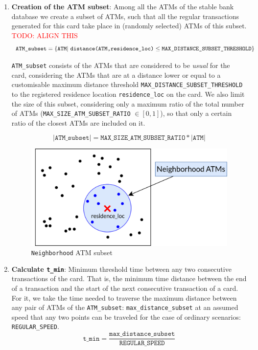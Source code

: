 \documentclass{article}
\begin{document}
\begin{enumerate}
    \item \textbf{Creation of the ATM subset}: Among all the ATMs of the stable bank database we create a subset of ATMs, such that all the regular transactions generated for this card take place in (randomly selected) ATMs of this subset. 
    \textcolor{red}{TODO: ALIGN THIS}
    $$\texttt{ATM\_subset} = \{\texttt{ATM}\ \\
    |\ \texttt{distance(ATM,residence\_loc)} \leq \texttt{MAX\_DISTANCE\_SUBSET\_THRESHOLD}\}$$

    \texttt{ATM\_subset} consists of the ATMs that are considered to be \textit{usual} for the card, considering the ATMs that are at a distance lower or equal to a customisable maximum distance threshold \texttt{MAX\_DISTANCE\_SUBSET\_THRESHOLD} to the registered residence location \texttt{residence\_loc} on the card. We also limit the size of this subset, considering only a maximum ratio of the total number of ATMs (\texttt{MAX\_SIZE\_ATM\_SUBSET\_RATIO} $\in [0,1]$), so that only a certain ratio of the closest ATMs are included on it.

    $$|\texttt{ATM\_subset}| = \texttt{MAX\_SIZE\_ATM\_SUBSET\_RATIO} * |\texttt{ATM}|$$


    \begin{figure}[H]
      \centering
      \includegraphics[scale=1.1]{images/tx-generation-1-named.png}
      \caption{\texttt{Neighborhood} ATM subset}
    \end{figure}

    \item \textbf{Calculate \texttt{t\_min}}: Minimum threshold time between any two consecutive transactions of the card. That is, the minimum time distance between the end of a transaction and the start of the next consecutive transaction of a card. For it, we take the time needed to traverse the maximum distance between any pair of ATMs of the \texttt{ATM\_subset}: \texttt{max\_distance\_subset} at an assumed speed that any two points can be traveled for the case of ordinary scenarios: \texttt{REGULAR\_SPEED}.
    $$\texttt{t\_min} = \frac{\texttt{max\_distance\_subset}}{\texttt{REGULAR\_SPEED}}$$


\end{enumerate}
\end{document}

